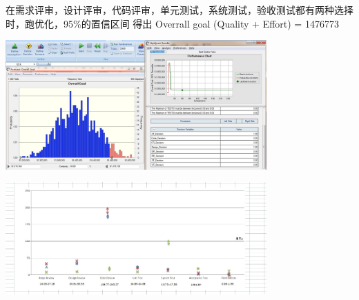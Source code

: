 在需求评审，设计评审，代码评审，单元测试，系统测试，验收测试都有两种选择时，跑优化，95\%的置信区间
得出 Overrall goal (Quality + Effort) = 1476773


\includegraphics[width=10cm]{微信截图_20211103023018.jpg}


\includegraphics[width=10cm]{微信截图_20211118145154.jpg}